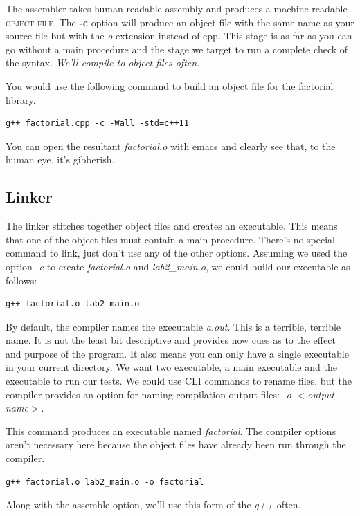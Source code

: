 \documentclass[]{tufte-handout}
\begin{document}
The assembler takes human readable assembly and produces a machine readable \textsc{object file}.   The \textbf{-c} option will produce an object file with the same name as your source file but with the \textit{o} extension instead of cpp.  This stage is as far as you can go without a main procedure and the stage we target to run a complete check of the syntax. \textit{We'll compile to object files often.}  

You would use the following command to build an object file for the factorial library.
\begin{verbatim}
g++ factorial.cpp -c -Wall -std=c++11
\end{verbatim}

You can open the resultant \textit{factorial.o} with emacs and clearly see that, to the human eye, it's gibberish.  

\subsection{Linker}

The linker stitches together object files and creates an executable.  This means that one of the object files must contain a main procedure.  There's no special command to link, just don't use any of the other options. Assuming we used the option \textit{-c} to create \textit{factorial.o} and \textit{lab2\_main.o}, we could build our executable as follows:
\begin{verbatim}
g++ factorial.o lab2_main.o 
\end{verbatim}
By default, the compiler names the executable \textit{a.out}. This is a terrible, terrible name. It is not the least bit descriptive and provides now cues as to the effect and purpose of the program. It also means you can only have a single executable in your current directory.  We want two executable, a main executable and the executable to run our tests. We could use CLI commands to rename files, but the compiler provides an option for naming compilation output files: \textit{-o $<$output-name$>$}.

This command produces an executable named \textit{factorial}. The compiler options aren't necessary here because the object files have already been run through the compiler.
\begin{verbatim}
g++ factorial.o lab2_main.o -o factorial
\end{verbatim}
Along with the assemble option, we'll use this form of the \textit{g++} often. 
\end{document}
